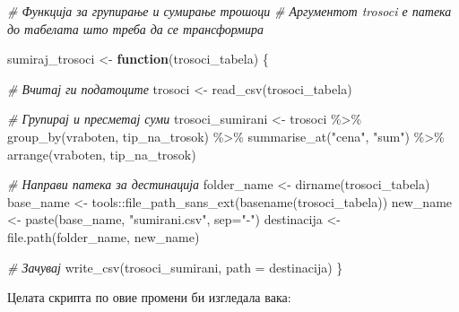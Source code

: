\documentclass[
]{book}
\newenvironment{Shaded}{\begin{snugshade}}{\end{snugshade}}
\newcommand{\AttributeTok}[1]{\textcolor[rgb]{0.77,0.63,0.00}{#1}}
\newcommand{\CommentTok}[1]{\textcolor[rgb]{0.56,0.35,0.01}{\textit{#1}}}
\newcommand{\ControlFlowTok}[1]{\textcolor[rgb]{0.13,0.29,0.53}{\textbf{#1}}}
\newcommand{\FunctionTok}[1]{\textcolor[rgb]{0.00,0.00,0.00}{#1}}
\newcommand{\NormalTok}[1]{#1}
\newcommand{\OtherTok}[1]{\textcolor[rgb]{0.56,0.35,0.01}{#1}}
\newcommand{\SpecialCharTok}[1]{\textcolor[rgb]{0.00,0.00,0.00}{#1}}
\newcommand{\StringTok}[1]{\textcolor[rgb]{0.31,0.60,0.02}{#1}}
\begin{document}
\begin{Shaded}
\begin{Highlighting}[]
\CommentTok{\# Функција за групирање и сумирање трошоци}
\CommentTok{\# Аргументот \textasciigrave{}trosoci\textasciigrave{} е патека до табелата што треба да се трансформира}

\NormalTok{sumiraj\_trosoci }\OtherTok{\textless{}{-}} \ControlFlowTok{function}\NormalTok{(trosoci\_tabela) \{}
  
  \CommentTok{\# Вчитај ги податоците}
\NormalTok{  trosoci }\OtherTok{\textless{}{-}} \FunctionTok{read\_csv}\NormalTok{(trosoci\_tabela)}
  
  \CommentTok{\# Групирај и пресметај суми}
\NormalTok{  trosoci\_sumirani }\OtherTok{\textless{}{-}}\NormalTok{ trosoci }\SpecialCharTok{\%\textgreater{}\%}
    \FunctionTok{group\_by}\NormalTok{(vraboten, tip\_na\_trosok) }\SpecialCharTok{\%\textgreater{}\%}
    \FunctionTok{summarise\_at}\NormalTok{(}\StringTok{"cena"}\NormalTok{, }\StringTok{"sum"}\NormalTok{) }\SpecialCharTok{\%\textgreater{}\%} 
  \FunctionTok{arrange}\NormalTok{(vraboten, tip\_na\_trosok)}
  
  \CommentTok{\# Направи патека за дестинација}
\NormalTok{  folder\_name }\OtherTok{\textless{}{-}} \FunctionTok{dirname}\NormalTok{(trosoci\_tabela)}
\NormalTok{  base\_name }\OtherTok{\textless{}{-}}\NormalTok{ tools}\SpecialCharTok{::}\FunctionTok{file\_path\_sans\_ext}\NormalTok{(}\FunctionTok{basename}\NormalTok{(trosoci\_tabela))}
\NormalTok{  new\_name }\OtherTok{\textless{}{-}} \FunctionTok{paste}\NormalTok{(base\_name, }\StringTok{"sumirani.csv"}\NormalTok{, }\AttributeTok{sep=}\StringTok{"{-}"}\NormalTok{)}
\NormalTok{  destinacija }\OtherTok{\textless{}{-}} \FunctionTok{file.path}\NormalTok{(folder\_name, new\_name)}
  
  \CommentTok{\# Зачувај}
  \FunctionTok{write\_csv}\NormalTok{(trosoci\_sumirani, }\AttributeTok{path =}\NormalTok{ destinacija)}
\NormalTok{\}}
\end{Highlighting}
\end{Shaded}

Целата скрипта по овие промени би изгледала вака:
\end{document}

